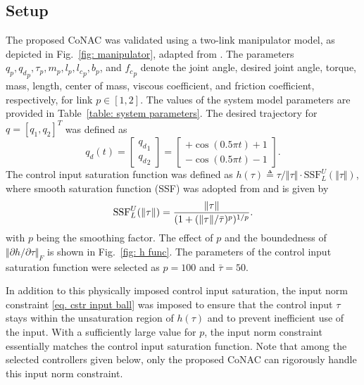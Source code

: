 \documentclass[lettersize,journal]{IEEEtran}
\begin{document}
\subsection{Setup}

The proposed CoNAC was validated using a two-link manipulator model, as depicted in Fig.~\ref{fig: manipulator}, adapted from \cite{RN32}. 
The parameters $q_p,{q_d}_p,\tau_p,m_p,l_p,{l_c}_p,b_p$, and ${f_c}_p$ denote the joint angle, desired joint angle, torque, mass, length, center of mass, viscous coefficient, and friction coefficient, respectively, for link $p\in[1,2]$.
The values of the system model parameters are provided in Table~\ref{table: system parameters}. The desired trajectory for ${q}=[q_1,q_2]^T$ was defined as
\begin{equation}
    {q_d}(t) = 
    \begin{bmatrix}
        {q_d}_1\\{q_d}_2
    \end{bmatrix}
    =
    \begin{bmatrix}
        +\cos(0.5\pi t) + 1 \\
        -\cos(0.5\pi t) - 1 
    \end{bmatrix}.
\end{equation}
The control input saturation function was defined as $h(\tau)\triangleq \tau/\Vert\tau\Vert \cdot \text{SSF}_L^U(\Vert\tau\Vert)$, where smooth saturation function (SSF) was adopted from \cite{RN28} and is given by
\begin{equation}
    \text{SSF}_L^U(\Vert\tau\Vert) = {\Vert\tau\Vert\over (1+(\Vert\tau\Vert/\bar\tau)^p)^{1/p}}.
    \label{eq. h func}
\end{equation}
with $p$ being the smoothing factor. The effect of $p$ and the boundedness of $\Vert\partial h/\partial \tau\Vert_F$ is shown in Fig.~\ref{fig: h func}.
The parameters of the control input saturation function were selected as $p=100$ and $\bar\tau=50$. 

In addition to this physically imposed control input saturation, the input norm constraint \eqref{eq. cstr input ball} was imposed to ensure that the control input $\tau$ stays within the unsaturation region of $h(\tau)$ and to prevent inefficient use of the input. With a sufficiently large value for $p$, the input norm constraint essentially matches the control input saturation function. Note that among the selected controllers given below, only the proposed CoNAC can rigorously handle this input norm constraint.
\end{document}
